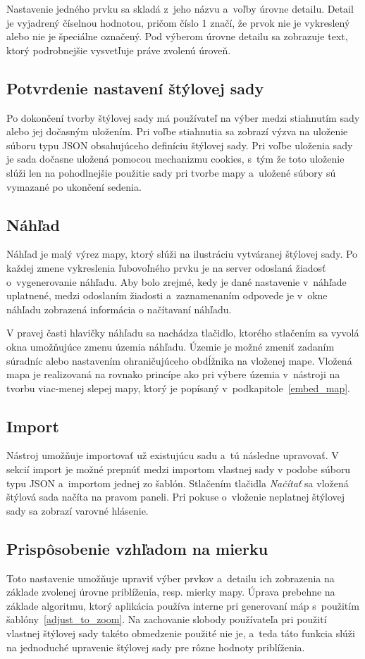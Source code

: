 Nastavenie jedného prvku sa skladá z~jeho názvu a~voľby úrovne detailu. Detail je vyjadrený číselnou hodnotou, pričom číslo 1 značí, že prvok nie je vykreslený alebo nie je špeciálne označený. Pod výberom úrovne detailu sa zobrazuje text, ktorý podrobnejšie vysvetľuje práve zvolenú úroveň.

\subsection*{Potvrdenie nastavení štýlovej sady}
Po dokončení tvorby štýlovej sady má používateľ na výber medzi stiahnutím sady alebo jej dočasným uložením. Pri voľbe stiahnutia sa zobrazí výzva na uloženie súboru typu JSON obsahujúceho definíciu štýlovej sady. Pri voľbe uloženia sady je sada dočasne uložená pomocou mechanizmu cookies, s~tým že toto uloženie slúži len na pohodlnejšie použitie sady pri tvorbe mapy a~uložené súbory sú vymazané po ukončení sedenia.

\subsection*{Náhľad}
Náhľad je malý výrez mapy, ktorý slúži na ilustráciu vytváranej štýlovej sady. Po každej zmene vykreslenia ľubovoľného prvku je na server odoslaná žiadosť o~vygenerovanie náhľadu. Aby bolo zrejmé, kedy je dané nastavenie v~náhľade uplatnené, medzi odoslaním žiadosti a~zaznamenaním odpovede je v~okne náhľadu zobrazená  informácia o načítavaní náhľadu.

V pravej časti hlavičky náhľadu sa nachádza tlačidlo, ktorého stlačením sa vyvolá okna umožňujúce zmenu územia náhľadu. Územie je možné zmeniť zadaním súradníc alebo nastavením ohraničujúceho obdĺžnika na vloženej mape. Vložená mapa je realizovaná na rovnako princípe ako pri výbere územia v~nástroji na tvorbu viac-menej slepej mapy, ktorý je popísaný v~podkapitole~\ref{embed_map}.

\subsection*{Import}
Nástroj umožňuje importovať už existujúcu sadu a~tú následne upravovať. V sekcií import je možné prepnúť medzi importom vlastnej sady v podobe súboru typu JSON a~importom jednej zo šablón. Stlačením tlačidla {\it Načítať} sa vložená štýlová sada načíta na pravom paneli. Pri pokuse o~vloženie neplatnej štýlovej sady sa zobrazí varovné hlásenie.

\subsection*{Prispôsobenie vzhľadom na mierku}
Toto nastavenie umožňuje upraviť výber prvkov a~detailu ich zobrazenia na základe zvolenej úrovne priblíženia, resp. mierky mapy. Úprava prebehne na základe algoritmu, ktorý aplikácia používa interne pri generovaní máp s~použitím šablóny~\ref{adjust_to_zoom}. Na zachovanie slobody používateľa pri použití vlastnej štýlovej sady takéto obmedzenie použité nie je, a~teda táto funkcia slúži na jednoduché upravenie štýlovej sady pre rôzne hodnoty priblíženia.


